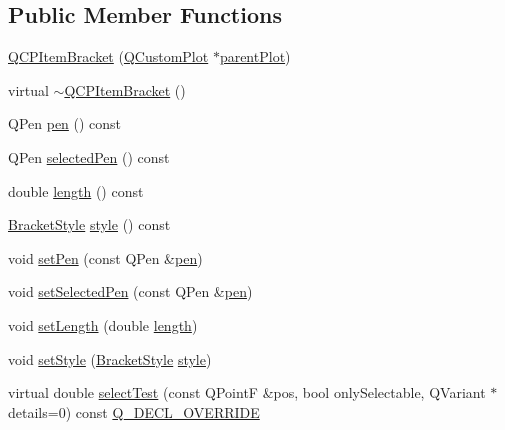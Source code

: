 \subsection*{Public Member Functions}
\begin{DoxyCompactItemize}
\item 
\mbox{\hyperlink{class_q_c_p_item_bracket_a44ecfa37a76de5e3549e2d61f9d8ee56}{Q\+C\+P\+Item\+Bracket}} (\mbox{\hyperlink{class_q_custom_plot}{Q\+Custom\+Plot}} $\ast$\mbox{\hyperlink{class_q_c_p_layerable_a473edb813a4c1929d6b6a8fe3ff3faf7}{parent\+Plot}})
\item 
virtual \mbox{\hyperlink{class_q_c_p_item_bracket_ad773c3e8e09868d6f8caeb92c54919f4}{$\sim$\+Q\+C\+P\+Item\+Bracket}} ()
\item 
Q\+Pen \mbox{\hyperlink{class_q_c_p_item_bracket_a6013b3f83aab7bc82b485ee5447ecb1b}{pen}} () const
\item 
Q\+Pen \mbox{\hyperlink{class_q_c_p_item_bracket_aff5318a5415b87d9753c84752c65dd14}{selected\+Pen}} () const
\item 
double \mbox{\hyperlink{class_q_c_p_item_bracket_af69dbe7ca5847f36403e1fb502e8e59d}{length}} () const
\item 
\mbox{\hyperlink{class_q_c_p_item_bracket_a7ac3afd0b24a607054e7212047d59dbd}{Bracket\+Style}} \mbox{\hyperlink{class_q_c_p_item_bracket_a600ad8c0a3193cc2f335db6039f2932d}{style}} () const
\item 
void \mbox{\hyperlink{class_q_c_p_item_bracket_ab13001d9cc5d8f9e56ea15bdda682acb}{set\+Pen}} (const Q\+Pen \&\mbox{\hyperlink{class_q_c_p_item_bracket_a6013b3f83aab7bc82b485ee5447ecb1b}{pen}})
\item 
void \mbox{\hyperlink{class_q_c_p_item_bracket_a349785c31122778a520c64891fa204c5}{set\+Selected\+Pen}} (const Q\+Pen \&\mbox{\hyperlink{class_q_c_p_item_bracket_a6013b3f83aab7bc82b485ee5447ecb1b}{pen}})
\item 
void \mbox{\hyperlink{class_q_c_p_item_bracket_ac7cfc3da7da9b5c5ac5dfbe4f0351b2a}{set\+Length}} (double \mbox{\hyperlink{class_q_c_p_item_bracket_af69dbe7ca5847f36403e1fb502e8e59d}{length}})
\item 
void \mbox{\hyperlink{class_q_c_p_item_bracket_a612dffa2373422eef8754d690add3703}{set\+Style}} (\mbox{\hyperlink{class_q_c_p_item_bracket_a7ac3afd0b24a607054e7212047d59dbd}{Bracket\+Style}} \mbox{\hyperlink{class_q_c_p_item_bracket_a600ad8c0a3193cc2f335db6039f2932d}{style}})
\item 
virtual double \mbox{\hyperlink{class_q_c_p_item_bracket_a49a6b2f41e0a8c2a2e3a2836027a8455}{select\+Test}} (const Q\+PointF \&pos, bool only\+Selectable, Q\+Variant $\ast$details=0) const \mbox{\hyperlink{qcustomplot_8h_a42cc5eaeb25b85f8b52d2a4b94c56f55}{Q\+\_\+\+D\+E\+C\+L\+\_\+\+O\+V\+E\+R\+R\+I\+DE}}
\end{DoxyCompactItemize}
